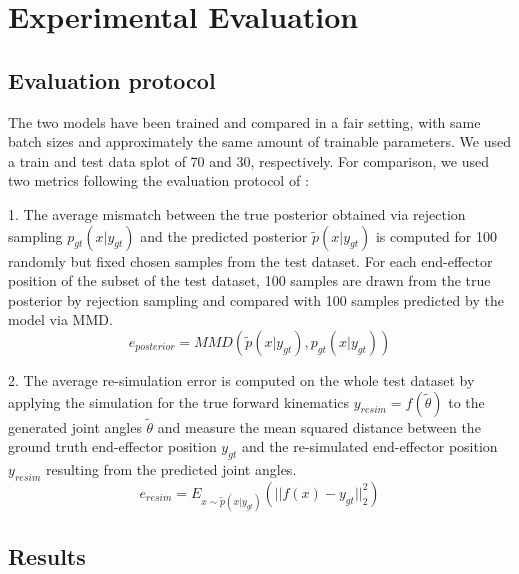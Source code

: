 \documentclass[conference]{IEEEtran}
\begin{document}
\section*{Experimental Evaluation}
\subsection*{Evaluation protocol}
The two models have been trained and compared in a fair setting, with same batch sizes and approximately the same amount of trainable parameters. We used a train and test data splot of 70 and 30, respectively. For comparison, we used two metrics following the evaluation protocol of \cite{Kruse2019}:

1. The average mismatch between the true posterior obtained via rejection sampling $p_{gt}(x | y_{gt})$ and the predicted posterior $\tilde p(x | y_{gt})$ is computed for 100 randomly but fixed chosen samples from the test dataset. For each end-effector position of the subset of the test dataset, 100 samples are drawn from the true posterior by rejection sampling and compared with 100 samples predicted by the model via MMD.
\begin{equation}
e_{posterior} = MMD(\tilde p(x | y_{gt}), p_{gt}(x | y_{gt}))
\end{equation}

2. The average re-simulation error is computed on the whole test dataset by applying the simulation for the true forward kinematics $y_{resim} = f( \tilde \theta)$ to the generated joint angles $\tilde \theta$ and measure the mean squared distance between the ground truth end-effector position $y_{gt}$ and the re-simulated end-effector position $y_{resim}$ resulting from the predicted joint angles.
\begin{equation}
e_{resim} = E_{x \sim \tilde{p}(x|y_{gt})}(|| f(x) - y_{gt}||^2_2)
\end{equation}

\subsection*{Results}
\end{document}
